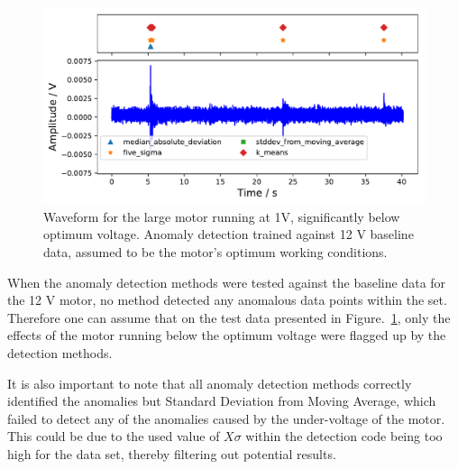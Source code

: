 
\begin{figure}[t]
    \includegraphics[width=1.0\textwidth]{fig/large_1V_nowater_large_12V.pdf}
    \caption[Undervoltage of Large Motor2]{Waveform for the large motor running at 1V, significantly below optimum voltage. Anomaly detection trained against 12 V baseline data, assumed to be the motor's optimum working conditions.}
    \label{fig:largemotor_1V}
\end{figure}

When the anomaly detection methods were tested against the baseline data for the 12 V motor, no method detected any anomalous data points within the set. Therefore one can assume that on the test data presented in Figure.~\ref{fig:largemotor_1V}, only the effects of the motor running below the optimum voltage were flagged up by the detection methods. 

It is also important to note that all anomaly detection methods correctly identified the anomalies but Standard Deviation from Moving Average, which failed to detect any of the anomalies caused by the under-voltage of the motor. This could be due to the used value of $X\sigma$ within the detection code being too high for the data set, thereby filtering out potential results.

